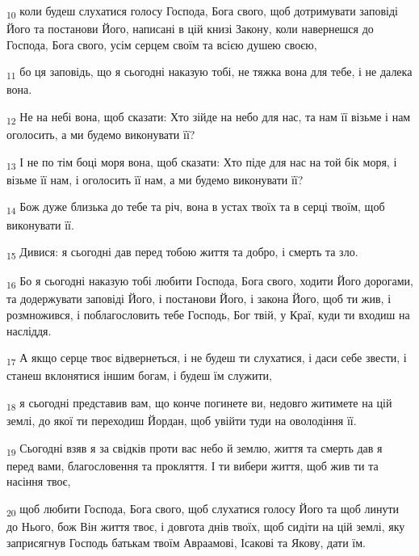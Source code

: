 \begin{tcolorbox}
\textsubscript{10} коли будеш слухатися голосу Господа, Бога свого, щоб дотримувати заповіді Його та постанови Його, написані в цій книзі Закону, коли навернешся до Господа, Бога свого, усім серцем своїм та всією душею своєю,
\end{tcolorbox}
\begin{tcolorbox}
\textsubscript{11} бо ця заповідь, що я сьогодні наказую тобі, не тяжка вона для тебе, і не далека вона.
\end{tcolorbox}
\begin{tcolorbox}
\textsubscript{12} Не на небі вона, щоб сказати: Хто зійде на небо для нас, та нам її візьме і нам оголосить, а ми будемо виконувати її?
\end{tcolorbox}
\begin{tcolorbox}
\textsubscript{13} І не по тім боці моря вона, щоб сказати: Хто піде для нас на той бік моря, і візьме її нам, і оголосить її нам, а ми будемо виконувати її?
\end{tcolorbox}
\begin{tcolorbox}
\textsubscript{14} Бож дуже близька до тебе та річ, вона в устах твоїх та в серці твоїм, щоб виконувати її.
\end{tcolorbox}
\begin{tcolorbox}
\textsubscript{15} Дивися: я сьогодні дав перед тобою життя та добро, і смерть та зло.
\end{tcolorbox}
\begin{tcolorbox}
\textsubscript{16} Бо я сьогодні наказую тобі любити Господа, Бога свого, ходити Його дорогами, та додержувати заповіді Його, і постанови Його, і закона Його, щоб ти жив, і розмножився, і поблагословить тебе Господь, Бог твій, у Краї, куди ти входиш на насліддя.
\end{tcolorbox}
\begin{tcolorbox}
\textsubscript{17} А якщо серце твоє відвернеться, і не будеш ти слухатися, і даси себе звести, і станеш вклонятися іншим богам, і будеш їм служити,
\end{tcolorbox}
\begin{tcolorbox}
\textsubscript{18} я сьогодні представив вам, що конче погинете ви, недовго житимете на цій землі, до якої ти переходиш Йордан, щоб увійти туди на оволодіння її.
\end{tcolorbox}
\begin{tcolorbox}
\textsubscript{19} Сьогодні взяв я за свідків проти вас небо й землю, життя та смерть дав я перед вами, благословення та прокляття. І ти вибери життя, щоб жив ти та насіння твоє,
\end{tcolorbox}
\begin{tcolorbox}
\textsubscript{20} щоб любити Господа, Бога свого, щоб слухатися голосу Його та щоб линути до Нього, бож Він життя твоє, і довгота днів твоїх, щоб сидіти на цій землі, яку заприсягнув Господь батькам твоїм Авраамові, Ісакові та Якову, дати їм.
\end{tcolorbox}
